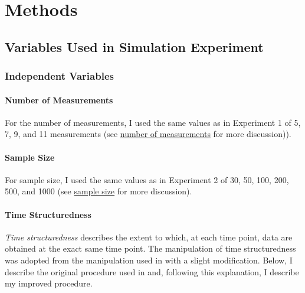 \documentclass[
12pt, %
twoside,
english]{guelphthesis}
\begin{document}
\hypertarget{methods-2}{%
\section{Methods}\label{methods-2}}

\hypertarget{variables-used-in-simulation-experiment-2}{%
\subsection{Variables Used in Simulation Experiment}\label{variables-used-in-simulation-experiment-2}}

\hypertarget{independent-variables-2}{%
\subsubsection{Independent Variables}\label{independent-variables-2}}

\hypertarget{number-of-measurements-2}{%
\paragraph{Number of Measurements}\label{number-of-measurements-2}}

For the number of measurements, I used the same values as in Experiment 1 of 5, 7, 9, and 11 measurements (see \protect\hyperlink{number-measurements}{number of measurements} for more discussion)).

\hypertarget{sample-size-1}{%
\paragraph{Sample Size}\label{sample-size-1}}

For sample size, I used the same values as in Experiment 2 of 30, 50, 100, 200, 500, and 1000 (see \protect\hyperlink{sample-size}{sample size} for more discussion).

\hypertarget{time-structuredness-1}{%
\paragraph{Time Structuredness}\label{time-structuredness-1}}

\emph{Time structuredness} describes the extent to which, at each time point, data are obtained at the exact same time point. The manipulation of time structuredness was adopted from the manipulation used in \textcite{coulombe2016} with a slight modification. Below, I describe the original procedure used in \textcite{coulombe2016} and, following this explanation, I describe my improved procedure.
\end{document}
